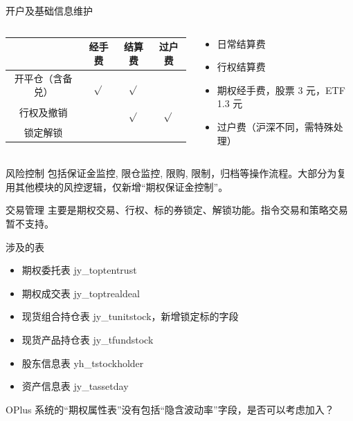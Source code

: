 \documentclass[12pt]{ctexbeamer}	%
\begin{document}
\begin{frame}{开户及基础信息维护}
  \begin{columns}
    \begin{column}{0.70\textwidth}
      \begin{tabular}{ c | c | c | c }
        \hline
         & 经手费 & 结算费 & 过户费 \\
        \hline
        开平仓（含备兑） & $\sqrt{}$ & $\sqrt{}$ &  \\
        \hline
        行权及撤销 &  & $\sqrt{}$ & $\sqrt{}$ \\
        \hline
        锁定解锁 & & & \\
        \hline
      \end{tabular}
    \end{column}
    \begin{column}{0.30\textwidth}
      \begin{itemize}
        \item 日常结算费
        \item 行权结算费
        \item 期权经手费，股票 3 元，ETF 1.3 元
        \item 过户费（沪深不同，需特殊处理）
      \end{itemize}
    \end{column}
  \end{columns}
\end{frame}

\begin{frame}{风险控制}
  包括保证金监控, 限仓监控, 限购, 限制，归档等操作流程。大部分为复用其他模块的风控逻辑，仅新增“期权保证金控制”。
\end{frame}

\begin{frame}{交易管理}
  主要是期权交易、行权、标的券锁定、解锁功能。指令交易和策略交易暂不支持。
  \begin{block}{涉及的表}
    \begin{itemize}
      \item 期权委托表 jy\_toptentrust
      \item 期权成交表 jy\_toptrealdeal
      \item 现货组合持仓表 jy\_tunitstock，新增锁定标的字段
      \item 现货产品持仓表 jy\_tfundstock
      \item 股东信息表 yh\_tstockholder
      \item 资产信息表 jy\_tassetday
    \end{itemize}
  \end{block}
  OPlus 系统的“期权属性表”没有包括“隐含波动率”字段，是否可以考虑加入？
\end{frame}
\end{document}
